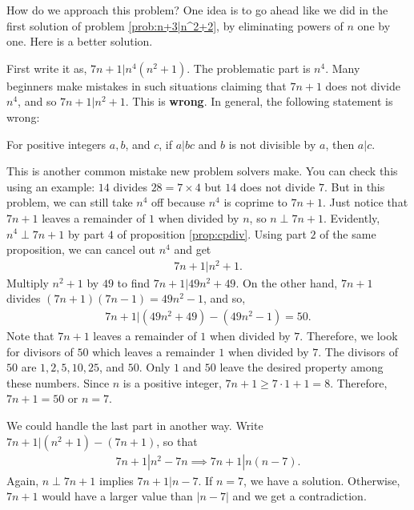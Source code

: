 \documentclass{subfile}
\begin{document}
		\begin{solution}
			How do we approach this problem? One idea is to go ahead like we did in the first solution of problem \eqref{prob:n+3|n^2+2}, by eliminating powers of $n$ one by one. Here is a better solution.

			First write it as, $7n+1|n^4(n^2+1)$. The problematic part is $n^4$. Many beginners make mistakes in such situations claiming that $7n+1$ does not divide $n^4$, and so $7n+1|n^2+1$. This is \textbf{wrong}. In general, the following statement is wrong:
			\begin{displayquote}
				For positive integers $a,b$, and $c$, if $a|bc$ and $b$ is not divisible by $a$, then $a|c$.
			\end{displayquote}
			This is another common  mistake new problem solvers make. You can check this using an example: $14$ divides $28=7\times4$ but $14$ does not divide $7$. But in this problem, we can still take $n^4$ off because $n^4$ is coprime to $7n+1$. Just notice that $7n+1$ leaves a remainder of $1$ when divided by $n$, so $n\perp7n+1$. Evidently, $n^4\perp7n+1$ by part $4$ of proposition \eqref{prop:cpdiv}. Using part $2$ of the same proposition, we can cancel out $n^4$ and get
				\begin{align*}
					7n+1  |n^2+1.
				\end{align*}
			Multiply $n^2+1$ by $49$ to find $ 7n+1 |49n^2+49$. On the other hand, $7n+1$ divides $(7n+1)(7n-1)=49n^2-1$, and so,
				\begin{align*}
					7n+1|(49n^2+49)-(49n^2-1) = 50.
				\end{align*}
			Note that $7n+1$ leaves a remainder of $1$ when divided by $7$. Therefore, we look for divisors of $50$ which leaves a remainder $1$ when divided by $7$. The divisors of $50$ are $1,2,5,10,25$, and $50$. Only $1$ and $50$ leave the desired property among these numbers. Since $n$ is a positive integer, $7n+1\geq7\cdot1+1=8$. Therefore, $7n+1=50$ or $n=7$.
		\end{solution}

		\begin{remark}
			We could handle the last part in another way. Write $7n+1|(n^2+1)-(7n+1)$, so that
				\begin{align*}
					7n+1  |n^2-7n \implies 7n+1| n(n-7).
				\end{align*}
			Again, $n\perp7n+1$ implies $7n+1|n-7$. If $n=7$, we have a solution. Otherwise, $7n+1$ would have a larger value than $|n-7|$ and we get a contradiction.
		\end{remark}
\end{document}
